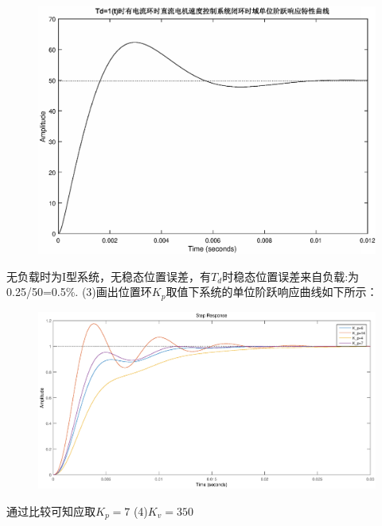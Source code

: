 \documentclass[10.5pt]{ctexart}
\begin{document}
\begin{figure}[!ht]
\centering
\includegraphics[width=400pt]{step_response_4132.eps}
\end{figure}

无负载时为I型系统，无稳态位置误差，有$T_d$时稳态位置误差来自负载:为0.25/50=0.5\%.
(3)画出位置环$K_p$取值下系统的单位阶跃响应曲线如下所示：
\begin{figure}[!ht]
\centering
\includegraphics[width=400pt]{Compare.eps}
\end{figure}
通过比较可知应取$K_p=7$
(4)$K_v=350$
\newpage
\end{document}
